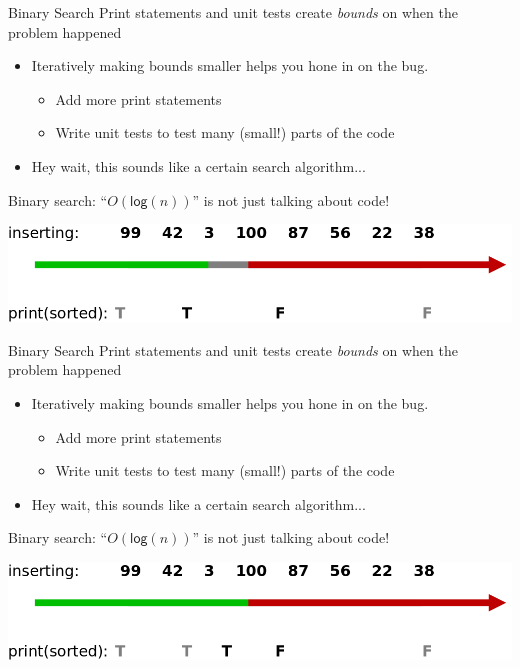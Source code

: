 \documentclass[xcolor=dvipsnames]{beamer}
\begin{document}
\begin{frame}{Binary Search}
	Print statements and unit tests create {\em bounds} on when the problem happened
	\begin{itemize}
		\item Iteratively making bounds smaller helps you hone in on the bug.
		\begin{itemize}
			\item Add more print statements
			\item Write unit tests to test many (small!) parts of the code
		\end{itemize}
		\item Hey wait, this sounds like a certain search algorithm...
	\end{itemize}
	Binary search: ``$O(\mathsf{log}(n))$'' is not just talking about code!
	\linegap

	\includegraphics[width=\textwidth]{binary3.png}
\end{frame}
\begin{frame}{Binary Search}
	Print statements and unit tests create {\em bounds} on when the problem happened
	\begin{itemize}
		\item Iteratively making bounds smaller helps you hone in on the bug.
		\begin{itemize}
			\item Add more print statements
			\item Write unit tests to test many (small!) parts of the code
		\end{itemize}
		\item Hey wait, this sounds like a certain search algorithm...
	\end{itemize}
	Binary search: ``$O(\mathsf{log}(n))$'' is not just talking about code!
	\linegap

	\includegraphics[width=\textwidth]{binary4.png}
\end{frame}
\end{document}
